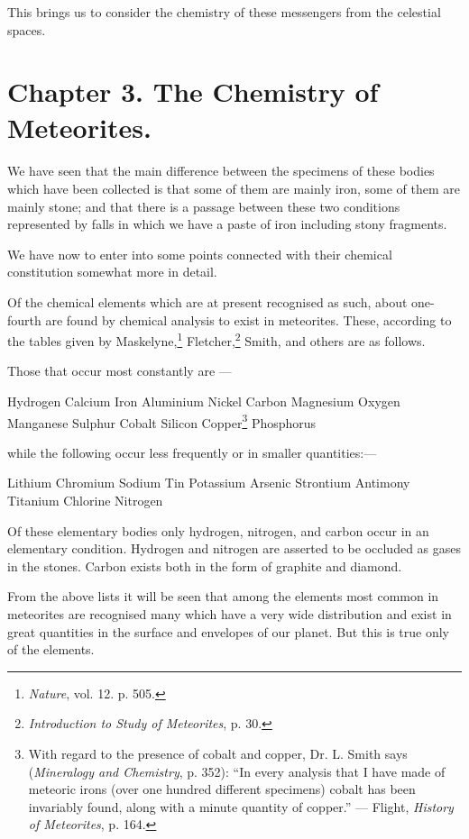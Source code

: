 \documentclass[a4paper, 12pt, oneside, polutonikogreek, english]{article}
\begin{document}
This brings us to consider the chemistry of these messengers from the celestial spaces.
\clearpage
\section{Chapter 3. The Chemistry of Meteorites.}
\paragraph{}
We have seen that the main difference between the specimens of these bodies which have been collected is that some of them are mainly iron, some of them are mainly stone; and that there is a passage between these two conditions represented by falls in which we have a paste of iron including stony fragments.

We have now to enter into some points connected with their chemical constitution somewhat more in detail.

Of the chemical elements which are at present recognised as such, about one-fourth are found by chemical analysis to exist in meteorites. These, according to the tables given by Maskelyne,\footnote{\emph{Nature}, vol. 12. p. 505.} Fletcher,\footnote{\emph{Introduction to Study of Meteorites}, p. 30.} Smith, and others are as follows.

Those that occur most constantly are ---

Hydrogen 
Calcium 
Iron 
Aluminium 
Nickel 
Carbon 
Magnesium 
Oxygen 
Manganese 
Sulphur 
Cobalt 
Silicon 
Copper\footnote{With regard to the presence of cobalt and copper, Dr. L. Smith says (\emph{Mineralogy and Chemistry}, p. 352): ``In every analysis that I have made of meteoric irons (over one hundred different specimens) cobalt has been invariably found, along with a minute quantity of copper.'' --- Flight, \emph{History of Meteorites}, p. 164.} 
Phosphorus 

while the following occur less frequently or in smaller quantities:---

Lithium 
Chromium Sodium 
Tin Potassium 
Arsenic Strontium 
Antimony Titanium 
Chlorine Nitrogen 

Of these elementary bodies only hydrogen, nitrogen, and carbon occur in an elementary condition. Hydrogen and nitrogen are asserted to be occluded as gases in the stones. Carbon exists both in the form of graphite and diamond.

From the above lists it will be seen that among the elements most common in meteorites are recognised many which have a very wide distribution and exist in great quantities in the surface and envelopes of our planet. But this is true only of the elements.
\end{document}
